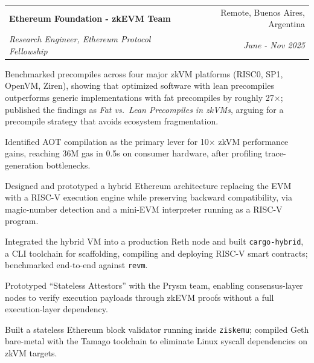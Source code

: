 \documentclass[11pt,a4paper]{article}
\makeatletter
\newcommand{\cventry}[4]{%
  \begin{tabular*}{\linewidth}[t]{@{\extracolsep{\fill}}l r@{}}
    \textbf{#1} & #2 \\
    \textit{#3} & \textit{#4}
  \end{tabular*}%
}
\makeatother
\begin{document}
\begin{cventries}
\item \cventry{Ethereum Foundation - zkEVM Team}{Remote, Buenos Aires, Argentina}
              {Research Engineer, Ethereum Protocol Fellowship}{June - Nov 2025}
\begin{cvbullets}
  \item Benchmarked precompiles across four major zkVM platforms (RISC0, SP1, OpenVM, Ziren), showing
        that optimized software with lean precompiles outperforms generic implementations with fat
        precompiles by roughly 27$\times$; published the findings as \textit{Fat vs.\ Lean Precompiles in
        zkVMs}, arguing for a precompile strategy that avoids ecosystem fragmentation.
  \item Identified AOT compilation as the primary lever for 10$\times$ zkVM performance gains, reaching
        36M gas in 0.5s on consumer hardware, after profiling trace-generation bottlenecks.
  \item Designed and prototyped a hybrid Ethereum architecture replacing the EVM with a RISC-V execution
        engine while preserving backward compatibility, via magic-number detection and a mini-EVM
        interpreter running as a RISC-V program.
  \item Integrated the hybrid VM into a production Reth node and built \texttt{cargo-hybrid}, a CLI
        toolchain for scaffolding, compiling and deploying RISC-V smart contracts; benchmarked end-to-end
        against \texttt{revm}.
  \item Prototyped ``Stateless Attestors'' with the Prysm team, enabling consensus-layer nodes to verify
        execution payloads through zkEVM proofs without a full execution-layer dependency.
  \item Built a stateless Ethereum block validator running inside \texttt{ziskemu}; compiled Geth
        bare-metal with the Tamago toolchain to eliminate Linux syscall dependencies on zkVM targets.
\end{cvbullets}



\end{cventries}
\end{document}
